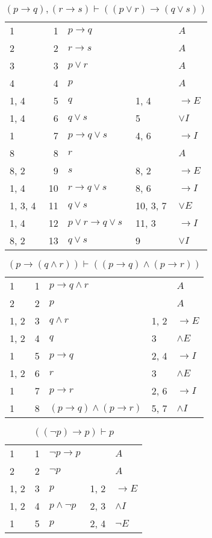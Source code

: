\documentclass{article}
\begin{document}
\begin{table}[htbp]\caption*{$(p→q),(r→s) ⊢ ((p∨r)→(q∨s))$}\centering\begin{tabular}{lrlll}
		{1} & 1 & $p→q$ & {} & $A$ \\
		{2} & 2 & $r→s$ & {} & $A$ \\
		{3} & 3 & $p∨r$ & {} & $A$ \\
		{4} & 4 & $p$ & {} & $A$ \\
		{1, 4} & 5 & $q$ & {1, 4} & $→E$ \\
		{1, 4} & 6 & $q∨s$ & {5} & $∨I$ \\
		{1} & 7 & $p→q∨s$ & {4, 6} & $→I$ \\
		{8} & 8 & $r$ & {} & $A$ \\
		{8, 2} & 9 & $s$ & {8, 2} & $→E$ \\
		{1, 4} & 10 & $r→q∨s$ & {8, 6} & $→I$ \\
		{1, 3, 4} & 11 & $q∨s$ & {10, 3, 7} & $∨E$ \\
		{1, 4} & 12 & $p∨r→q∨s$ & {11, 3} & $→I$ \\
		{8, 2} & 13 & $q∨s$ & {9} & $∨I$ \\
	\end{tabular}
\end{table}
\begin{table}[htbp]\caption*{$(p→(q∧r)) ⊢ ((p→q)∧(p→r))$}\centering\begin{tabular}{lrlll}
		{1} & 1 & $p→q∧r$ & {} & $A$ \\
		{2} & 2 & $p$ & {} & $A$ \\
		{1, 2} & 3 & $q∧r$ & {1, 2} & $→E$ \\
		{1, 2} & 4 & $q$ & {3} & $∧E$ \\
		{1} & 5 & $p→q$ & {2, 4} & $→I$ \\
		{1, 2} & 6 & $r$ & {3} & $∧E$ \\
		{1} & 7 & $p→r$ & {2, 6} & $→I$ \\
		{1} & 8 & $(p→q)∧(p→r)$ & {5, 7} & $∧I$ \\
	\end{tabular}
\end{table}
\begin{table}[htbp]\caption*{$((¬p)→p) ⊢ p$}\centering\begin{tabular}{lrlll}
		{1} & 1 & $¬p→p$ & {} & $A$ \\
		{2} & 2 & $¬p$ & {} & $A$ \\
		{1, 2} & 3 & $p$ & {1, 2} & $→E$ \\
		{1, 2} & 4 & $p∧ ¬p$ & {2, 3} & $∧I$ \\
		{1} & 5 & $p$ & {2, 4} & $¬E$ \\
	\end{tabular}
\end{table}
\end{document}
